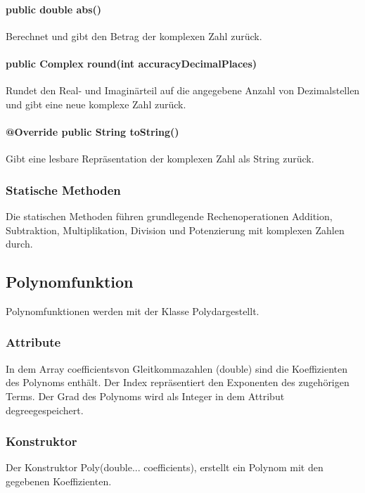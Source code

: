 \documentclass[12pt]{article}
\begin{document}
\paragraph{public double abs()} 
Berechnet und gibt den Betrag der komplexen Zahl zurück.

\paragraph{public Complex round(int accuracyDecimalPlaces)} 
Rundet den Real- und Imaginärteil auf die angegebene Anzahl von Dezimalstellen und gibt eine neue komplexe Zahl zurück.

\paragraph{@Override public String toString()} 
Gibt eine lesbare Repräsentation der komplexen Zahl als String zurück.

\subsubsection{Statische Methoden}
Die statischen Methoden führen grundlegende Rechenoperationen Addition, Subtraktion, Multiplikation, Division und Potenzierung mit komplexen Zahlen durch.

\subsection{Polynomfunktion}
Polynomfunktionen werden mit der Klasse \glqq Poly\grqq\space dargestellt. 

\subsubsection{Attribute}
In dem Array \glqq coefficients\grqq\space von Gleitkommazahlen (double) sind die Koeffizienten des Polynoms enthält. Der Index repräsentiert den Exponenten des zugehörigen Terms.
Der Grad des Polynoms wird als Integer in dem Attribut \glqq degree\grqq\space gespeichert. 

\subsubsection{Konstruktor}
Der Konstruktor \glqq Poly(double... coefficients)\grqq, erstellt ein Polynom mit den gegebenen Koeffizienten.
\end{document}
